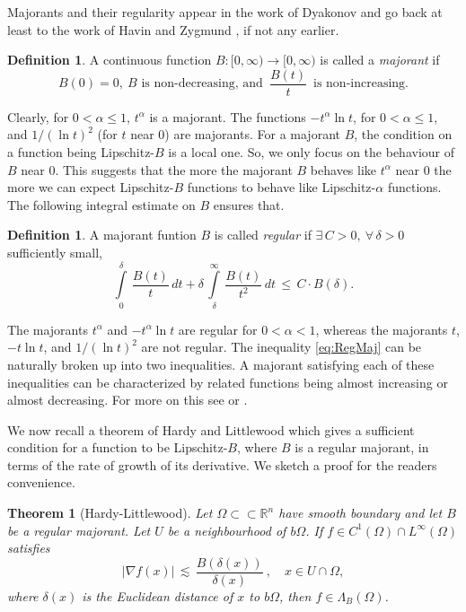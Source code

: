 \documentclass[12pt,a4paper]{amsart}
\numberwithin{equation}{section}
\newtheorem{theorem}[equation]{Theorem}
\theoremstyle{definition}
\newtheorem{definition}[equation]{Definition}
\begin{document}
Majorants and their regularity appear in the work of Dyakonov \cite{Dya97} and go back at least to the work of Havin \cite{Hav71} and Zygmund \cite{Zyg59}, if not any earlier.
\begin{definition} \label{defn:Majorant} A continuous function $B : [0,\infty) \rightarrow [0,\infty)$ is called a \textit{majorant} if
\[B(0)=0,\  B \text{ is non-decreasing, and }\, \frac{B(t)}{t}\, \text{ is non-increasing}.\]
\end{definition}

Clearly, for $0<\alpha\le 1$, $t^\alpha$ is a majorant. The functions $-t^{\alpha}\ln t$, for $0<\alpha \le 1$, and $1/\left(\ln t\right)^2$ (for $t$ near $0$) are majorants. For a majorant $B$, the condition on a function being Lipschitz-$B$ is a local one. So, we only focus on the behaviour of $B$ near 0. This suggests that the more the 
majorant $B$ behaves like $t^{\alpha}$ near 0 the more we can expect Lipschitz-$B$ functions to behave like Lipschitz-$\alpha$ functions. The following integral estimate on $B$ ensures that.

\begin{definition}\label{defn:RegMaj}A majorant funtion $B$ is called \textit{regular} if $\exists\, C>0,\ \forall\, \delta >0$ sufficiently small,
\begin{equation}\label{eq:RegMaj}
\int\limits_0^{\delta}\, \frac{B(t)}{t}\, dt + \delta\,\int\limits_{\delta}^{\infty}\, \frac{B(t)}{t^2}\, dt\, \le\, C\cdot B(\delta).
\end{equation}
\end{definition}

The majorants $t^\alpha$ and $-t^{\alpha}\ln t$ are regular for $0<\alpha <1$, whereas the majorants $t$, $-t\ln t$, and $1/(\ln t)^2$ are not regular. The inequality \eqref{eq:RegMaj} can be naturally broken up into 
two inequalities. A majorant satisfying each of these inequalities can be characterized by related functions being almost increasing or almost decreasing. For more on this see \cite[Proposition 1]{Pav07-LipHarmonic} or \cite[Section 2A]{Rav11}.

We now recall a theorem of Hardy and Littlewood which gives a sufficient condition for a function to be Lipschitz-$B$, where $B$ is a regular majorant, in terms of the rate of growth of its derivative. We sketch a 
proof for the readers convenience.

\begin{theorem}[Hardy-Littlewood]\label{thm:H-L}Let $\Omega \subset\subset \mathbb{R}^n$ have smooth boundary and let $B$ be a regular majorant. Let $U$ be a neighbourhood of $b\Omega$. If $f \in C^{1}\left(\Omega\right) \cap L^{\infty}\left(\Omega\right)$ satisfies
\[{\left\lvert{\nabla f(x)}\right\rvert} \, \lesssim\, \frac{B\left(\delta(x)\right)}{\delta(x)}\ , \quad x \in U\cap\Omega ,\]
where $\delta(x)$ is the Euclidean distance of $x$ to $b\Omega$, then $f\in\Lambda_B\left(\Omega\right)$.
\end{theorem}
\end{document}
